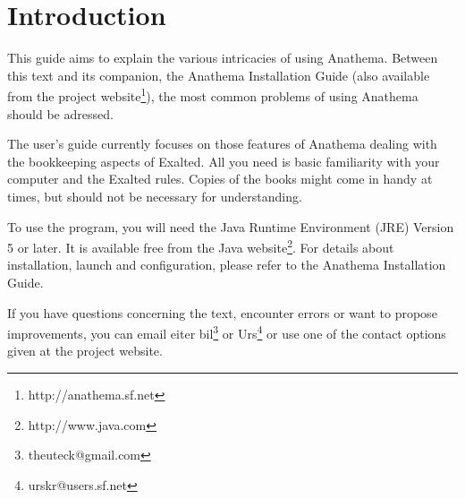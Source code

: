 \chapter{Introduction}
This guide aims to explain the various intricacies of using Anathema. Between this text and its companion, the Anathema Installation Guide (also available from the project website\footnote{http://anathema.sf.net}), the most common problems of using Anathema should be adressed.

The user's guide currently focuses on those features of Anathema dealing with the bookkeeping aspects of Exalted. All you need is basic familiarity with your computer and the Exalted rules. Copies of the books might come in handy at times, but should not be necessary for understanding.

To use the program, you will need the Java Runtime Environment (JRE) Version 5 or later. It is available free from the Java website\footnote{http://www.java.com}. For details about installation, launch and configuration, please refer to the Anathema Installation Guide.

If you have questions concerning the text, encounter errors or want to propose improvements, you can email eiter bil\footnote{theuteck@gmail.com} or Urs\footnote{urskr@users.sf.net} or use one of the contact options given at the project website.